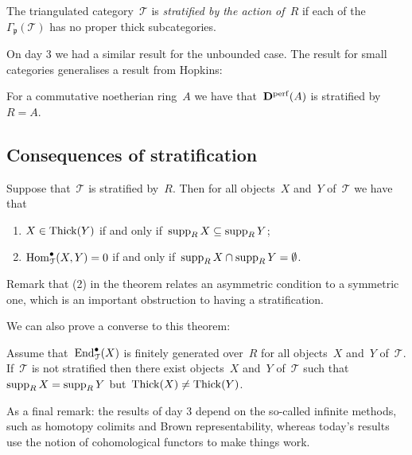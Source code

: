 \documentclass[10pt,a4paper]{article}
\begin{document}
\begin{definition}
  The triangulated category~$\mathcal{T}$ is \emph{stratified by the action of~$R$} if each of the~$\Gamma_{\mathfrak{p}}(\mathcal{T})$ has no proper thick subcategories.
\end{definition}

On day 3 we had a similar result for the unbounded case. The result for small categories generalises a result from Hopkins:
\begin{example}
  For a commutative noetherian ring~$A$ we have that~$\mathbf{D}^{\mathrm{perf}}(A)$ is stratified by~$R=A$.
\end{example}

\subsection{Consequences of stratification}
\begin{theorem}
  Suppose that~$\mathcal{T}$ is stratified by~$R$. Then for all objects~$X$ and~$Y$ of~$\mathcal{T}$ we have that
  \begin{enumerate}
    \item $X\in\operatorname{Thick}(Y)$ if and only if~$\operatorname{supp}_R X\subseteq\operatorname{supp}_R Y$;
    \item $\operatorname{Hom}_{\mathcal{T}}^\bullet(X,Y)=0$ if and only if~$\operatorname{supp}_R X\cap\operatorname{supp}_R Y=\emptyset$.
  \end{enumerate}
\end{theorem}
Remark that (2) in the theorem relates an asymmetric condition to a symmetric one, which is an important obstruction to having a stratification.

We can also prove a converse to this theorem:
\begin{proposition}
  Assume that~$\operatorname{End}_{\mathcal{T}}^\bullet(X)$ is finitely generated over~$R$ for all objects~$X$ and~$Y$ of~$\mathcal{T}$. If~$\mathcal{T}$ is not stratified then there exist objects~$X$ and~$Y$ of~$\mathcal{T}$ such that~$\operatorname{supp}_R X=\operatorname{supp}_R Y$ but~$\operatorname{Thick}(X)\neq\operatorname{Thick}(Y)$.
\end{proposition}

As a final remark: the results of day 3 depend on the so-called infinite methods, such as homotopy colimits and Brown representability, whereas today's results use the notion of cohomological functors to make things work.
\end{document}

